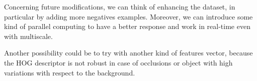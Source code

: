 \documentclass[a4paper, 10pt, onecolumn]{article} %
\begin{document}
Concerning future modifications, we can think of enhancing the dataset, in particular by adding more negatives examples. Moreover, we can introduce some kind of parallel computing to have a better response and work in real-time even with multiscale.

Another possibility could be to try with another kind of features vector, because the HOG descriptor is not robust in case of occlusions or object with high variations with respect to the background.
\end{document}
